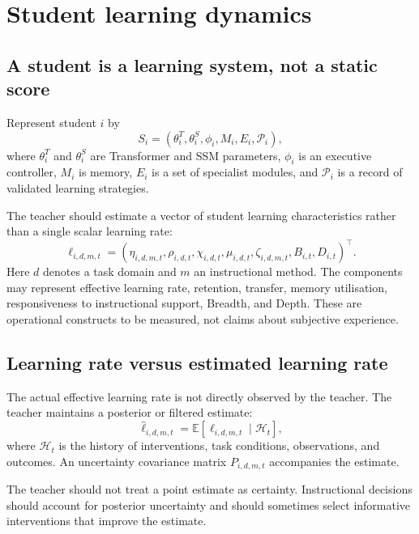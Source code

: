 \documentclass[11pt,a4paper]{article}
\begin{document}
\section{Student learning dynamics}

\subsection{A student is a learning system, not a static score}

Represent student \(i\) by
\begin{equation}
S_i=
(\theta_i^T,\theta_i^S,\phi_i,M_i,E_i,\mathcal P_i),
\end{equation}
where \(\theta_i^T\) and \(\theta_i^S\) are Transformer and SSM parameters, \(\phi_i\) is an executive controller, \(M_i\) is memory, \(E_i\) is a set of specialist modules, and \(\mathcal P_i\) is a record of validated learning strategies.

The teacher should estimate a vector of student learning characteristics rather than a single scalar learning rate:
\begin{equation}
\boldsymbol{\ell}_{i,d,m,t}
=
\left(
\eta_{i,d,m,t},
\rho_{i,d,t},
\chi_{i,d,t},
\mu_{i,d,t},
\zeta_{i,d,m,t},
B_{i,t},
D_{i,t}
\right)^\top.
\end{equation}
Here \(d\) denotes a task domain and \(m\) an instructional method. The components may represent effective learning rate, retention, transfer, memory utilisation, responsiveness to instructional support, Breadth, and Depth. These are operational constructs to be measured, not claims about subjective experience.

\subsection{Learning rate versus estimated learning rate}

The actual effective learning rate is not directly observed by the teacher. The teacher maintains a posterior or filtered estimate:
\begin{equation}
\widehat{\boldsymbol{\ell}}_{i,d,m,t}
=
\mathbb E[
\boldsymbol{\ell}_{i,d,m,t}\mid\mathcal H_t
],
\end{equation}
where \(\mathcal H_t\) is the history of interventions, task conditions, observations, and outcomes. An uncertainty covariance matrix \(P_{i,d,m,t}\) accompanies the estimate.

The teacher should not treat a point estimate as certainty. Instructional decisions should account for posterior uncertainty and should sometimes select informative interventions that improve the estimate.
\end{document}
